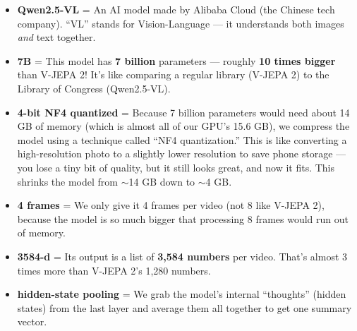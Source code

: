 \documentclass[12pt, a4paper]{article}
\begin{document}
\begin{keybox}
\begin{itemize}[leftmargin=0.5cm, itemsep=0.5cm]
    \item \textbf{Qwen2.5-VL} = An AI model made by Alibaba Cloud (the Chinese tech company). ``VL'' stands for Vision-Language — it understands both images \textit{and} text together.
    
    \item \textbf{7B} = This model has \textbf{7 billion} parameters — roughly \textbf{10 times bigger} than V-JEPA 2! It's like comparing a regular library (V-JEPA 2) to the Library of Congress (Qwen2.5-VL).
    
    \item \textbf{4-bit NF4 quantized} = Because 7 billion parameters would need about 14 GB of memory (which is almost all of our GPU's 15.6 GB), we compress the model using a technique called ``NF4 quantization.'' This is like converting a high-resolution photo to a slightly lower resolution to save phone storage — you lose a tiny bit of quality, but it still looks great, and now it fits. This shrinks the model from $\sim$14 GB down to $\sim$4 GB.
    
    \item \textbf{4 frames} = We only give it 4 frames per video (not 8 like V-JEPA 2), because the model is so much bigger that processing 8 frames would run out of memory.
    
    \item \textbf{3584-d} = Its output is a list of \textbf{3,584 numbers} per video. That's almost 3 times more than V-JEPA 2's 1,280 numbers.
    
    \item \textbf{hidden-state pooling} = We grab the model's internal ``thoughts'' (hidden states) from the last layer and average them all together to get one summary vector.
\end{itemize}
\end{keybox}
\end{document}
